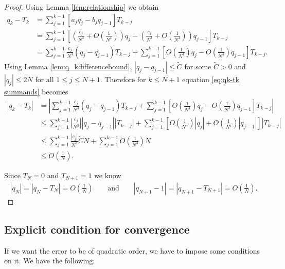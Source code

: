 \documentclass{amsart}
\theoremstyle{remark}
\theoremstyle{definition}
\newcommand{\lp}{\left(}
\newcommand{\rp}{\right)}
\newcommand{\lb}{\left[}
\newcommand{\rb}{\right]}
\begin{document}
\begin{proof}
	Using Lemma \ref{lem:relationship} we obtain
	\begin{align}
		q_k-T_k &= \sum_{j=1}^{k-1} [a_jq_j - b_jq_{j-1}] T_{k-j} \nonumber \\
		&= \sum_{j=1}^{k-1} \left[ \lp\frac{c_j}{N^3}+ {O\lp\frac{1}{N^4}\rp} \rp q_j - \lp \frac{c_j}{N^3}+ {O\lp\frac{1}{N^4}\rp} \rp q_{j-1} \right] T_{k-j} \nonumber \\
		&= \sum_{j=1}^{k-1} \frac{c_j}{N^3}(q_j-q_{j-1}) T_{k-j} + \sum_{j=1}^{k-1}\lb {O\lp \frac{1}{N^4}\rp} q_j- O\lp\frac{1}{N^4}\rp q_{j-1}\rb T_{k-j}.\label{eq:qk-tk summands}
	\end{align}
    Using Lemma \ref{lem:q_kdifferencebound}, $|q_j-q_{j-1}|\leq \tilde{C}$ for some $\tilde{C}>0$ and $|q_j|\leq 2N$ for all $1\leq j\leq N+1$. Therefore for $k\leq N+1$ equation \eqref{eq:qk-tk summands} becomes 
	\begin{align*}
		|q_k-T_k| &= \left|\sum_{j=1}^{k-1}\frac{c_j}{N^3}(q_j-q_{j-1})T_{k-j} +  \sum_{j=1}^{k-1}\lb {O\lp \frac{1}{N^4}\rp} q_j- O\lp\frac{1}{N^4}\rp q_{j-1}\rb T_{k-j} \right| \\
		&\leq  \sum_{j=1}^{k-1}\left|\frac{c_j}{N^3}\right||q_j-q_{j-1}| |T_{k-j} |+ \sum_{j=1}^{k-1} \lb O\lp\frac{1}{N^4}\rp |q_j| + O\lp\frac{1}{N^4}\rp |q_{j-1}|\rb |T_{k-j}|\\
		&\leq  \sum_{j=1}^{k-1}  \frac{|c_j|}{N^3} \tilde{C} N + \sum_{j=1}^{k-1} O\lp\frac{1}{N^3}\rp  N \\
		&\leq O\lp\frac{1}{N}\rp.
	\end{align*}
	
	Since $T_N=0$ and $T_{N+1}=1$ we know
	\begin{align*}
		|q_N| = |q_N-T_N| =O\lp\frac{1}{N}\rp \qquad\textrm{and}\qquad
        |q_{N+1}-1| = |q_{N+1}-T_{N+1}| = O\lp \frac{1}{N}\rp.
        \end{align*}
\end{proof}

\subsection{Explicit condition for convergence}

If we want the error to be of quadratic order, we have to impose some conditions on it. We have the following:
\end{document}
